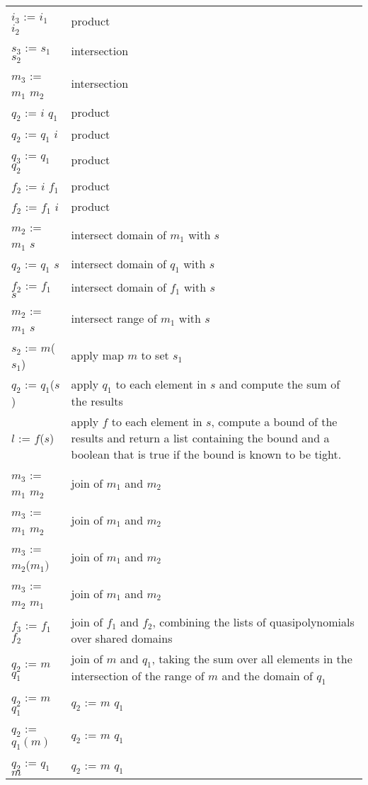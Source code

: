 \begin{supertabular}{p{0.35\textwidth}p{0.6\textwidth}}
\\
$i_3$ := $i_1$ \ai{$*$} $i_2$ & product
\\
$s_3$ := $s_1$ \ai{$*$} $s_2$ & intersection
\\
$m_3$ := $m_1$ \ai{$*$} $m_2$ & intersection
\\
$q_2$ := $i$ \ai{$*$} $q_1$ & product
\\
$q_2$ := $q_1$ \ai{$*$} $i$ & product
\\
$q_3$ := $q_1$ \ai{$*$} $q_2$ & product
\\
$f_2$ := $i$ \ai{$*$} $f_1$ & product
\\
$f_2$ := $f_1$ \ai{$*$} $i$ & product
\\
$m_2$ := $m_1$ \ai{$*$} $s$ & intersect domain of $m_1$ with $s$
\\
$q_2$ := $q_1$ \ai{$*$} $s$ & intersect domain of $q_1$ with $s$
\\
$f_2$ := $f_1$ \ai{$*$} $s$ & intersect domain of $f_1$ with $s$
\\
$m_2$ := $m_1$ \ai[\tt]{->$*$} $s$ & intersect range of $m_1$ with $s$
\\
$s_2$ := $m$($s_1$) & apply map $m$ to set $s_1$
\\
$q_2$ := $q_1$($s$) & apply $q_1$ to each element in $s$ and compute
the sum of the results
\\
$l$ := $f$($s$) & apply $f$ to each element in $s$, compute
a bound of the results
and return a list containing the bound
and a boolean that is true if the bound
is known to be tight.
\\
$m_3$ := $m_1$  $m_2$ & join of $m_1$ and $m_2$
\\
$m_3$ := $m_1$  $m_2$ & join of $m_1$ and $m_2$
\\
$m_3$ := $m_2$($m_1)$ & join of $m_1$ and $m_2$
\\
$m_3$ := $m_2$  $m_1$ & join of $m_1$ and $m_2$
\\
$f_3$ := $f_1$  $f_2$ & join of $f_1$ and $f_2$, combining
the lists of quasipolynomials over shared domains
\\
$q_2$ := $m$  $q_1$ & join of $m$ and $q_1$, taking the sum
over all elements in the intersection of the range of $m$ and the domain
of $q_1$
\\
$q_2$ := $m$  $q_1$ & $q_2$ := $m$  $q_1$
\\
$q_2$ := $q_1(m)$ & $q_2$ := $m$  $q_1$
\\
$q_2$ := $q_1$  $m$ & $q_2$ := $m$  $q_1$

\end{supertabular}
